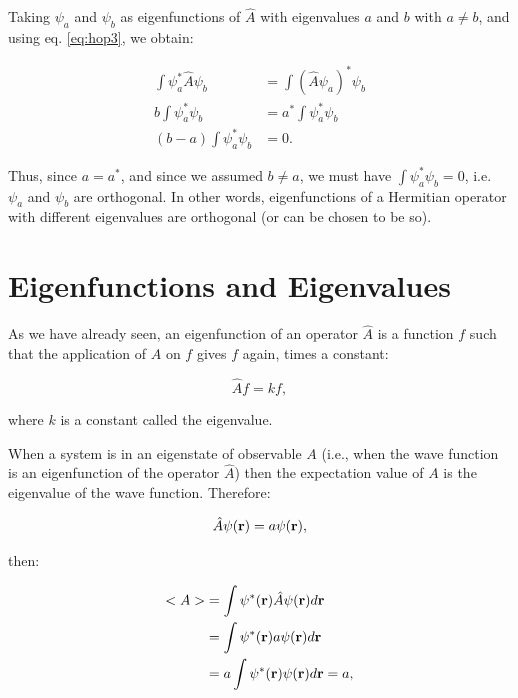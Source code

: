 \documentclass[
  9pt,
]{extbook}
\theoremstyle{definition}
\theoremstyle{definition}
\theoremstyle{definition}
\theoremstyle{remark}
\begin{document}
Taking \(\psi_a\) and \(\psi_b\) as eigenfunctions of \(\hat{A}\) with eigenvalues \(a\) and \(b\) with \(a \neq b\), and using eq. \eqref{eq:hop3}, we obtain:

\begin{equation}
\begin{aligned}
\int \psi_a^{*} \hat{A} \psi_b &= \int (\hat{A} \psi_a)^{*} \psi_b  \\
b \int \psi_a^{*} \psi_b    &= a^{*} \int \psi_a^{*} \psi_b \\
(b - a) \int \psi_a^{*} \psi_b &= 0.
\end{aligned}
\label{eq:hop5}
\end{equation}

Thus, since \(a = a^{*}\), and since we assumed \(b \neq a\), we must have \(\int \psi_a^{*} \psi_b = 0\), i.e.~\(\psi_a\) and \(\psi_b\) are orthogonal. In other words, eigenfunctions of a Hermitian operator with different eigenvalues are orthogonal (or can be chosen to be so).

\hypertarget{eigenfunctions-and-eigenvalues}{%
\section{Eigenfunctions and Eigenvalues}\label{eigenfunctions-and-eigenvalues}}

As we have already seen, an eigenfunction of an operator \(\hat{A}\) is a function \(f\) such that the application of \(\hat{A}\) on \(f\) gives \(f\) again, times a constant:

\begin{equation}
\hat{A} f = k f,
\label{eq:ee1}
\end{equation}

where \(k\) is a constant called the eigenvalue.

When a system is in an eigenstate of observable \(A\) (i.e., when the wave function is an eigenfunction of the operator \(\hat{A}\)) then the expectation value of \(A\) is the eigenvalue of the wave function. Therefore:

\begin{equation}
\hat{A} \psi({\bf r}) = a \psi({\bf r}),
\label{eq:ee2}
\end{equation}

then:

\begin{equation}
\begin{aligned}
<A> &= \int \psi^{*}({\bf r}) \hat{A} \psi({\bf r}) d{\bf r} \\
&= \int \psi^{*}({\bf r}) a \psi({\bf r}) d{\bf r} \\    
&= a \int \psi^{*}({\bf r}) \psi({\bf r}) d{\bf r} = a,  
\end{aligned}
\label{eq:ee3}
\end{equation}
\end{document}
